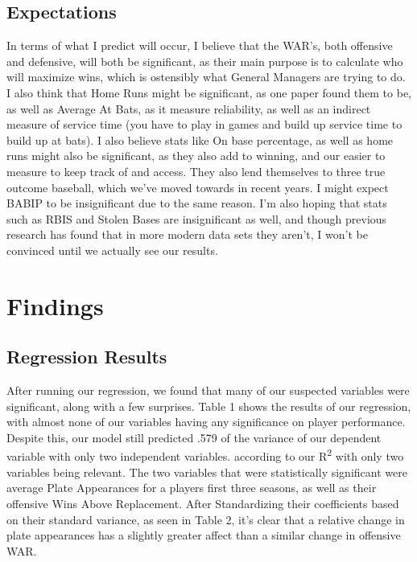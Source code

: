 \documentclass{article}
\begin{document}
\subsection{Expectations}
In terms of what I predict will occur, I believe that the WAR's, both offensive and defensive, will both be significant, as their main purpose is to calculate who will maximize wins, which is ostensibly what General Managers are trying to do. I also think that Home Runs might be significant, as one paper found them to be, as well as Average At Bats, as it measure reliability, as well as an indirect measure of service time (you have to play in games and build up service time to build up at bats). I also believe stats like On base percentage, as well as home runs might also be significant, as they also add to winning, and our easier to measure to keep track of and access. They also lend themselves to three true outcome baseball, which we've moved towards in recent years. I might expect BABIP to be insignificant due to the same reason. I'm also hoping that stats such as RBIS and Stolen Bases are insignificant as well, and though previous research has found that in more modern data sets they aren't, I won't be convinced until we actually see our results.



\section{Findings}
\subsection{Regression Results}
After running our regression, we found that many of our suspected variables were significant, along with a few surprises. Table 1 shows the results of our regression, with almost none of our variables having any significance on player performance. Despite this, our model still predicted .579 of the variance of our dependent variable with only two independent variables. according to our R\textsuperscript{2} with only two variables being relevant. The two variables that were statistically significant were average Plate Appearances for a players first three seasons, as well as their offensive Wins Above Replacement. After Standardizing their coefficients based on their standard variance, as seen in Table 2, it's clear that a relative change in plate appearances has a slightly greater affect than a similar change in offensive WAR.
\end{document}
